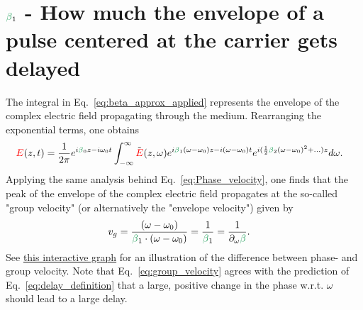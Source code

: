 \section{$\betag_1$ - How much the envelope of a pulse centered at the carrier gets delayed}
The integral in Eq.~\ref{eq:beta_approx_applied} represents the envelope of the complex electric field propagating through the medium. Rearranging the exponential terms, one obtains
\begin{align}
\label{eq:envelope_beta1}
    \E(z,t) &= \frac{1}{2\pi} e^{i\betag_0z-i\omega_0t}  \int_{-\infty}^{\infty} \Tilde{\E}(z,\omega) e^{i\betag_1(\omega-\omega_0)z-i(\omega-\omega_0) t} e^{i(\frac{1}{2}\betag_2(\omega-\omega_0)^2+...)z} d\omega.
\end{align}
Applying the same analysis behind Eq.~\ref{eq:Phase_velocity}, one finds that the peak of the envelope of the complex electric field propagates at the so-called "group velocity" (or alternatively the "envelope velocity") given by
\begin{align}
\label{eq:group_velocity}
    v_g &= \frac{(\omega-\omega_0)}{\betag_1\cdot(\omega-\omega_0)} = \frac{1}{\betag_1} = \frac{1}{\partial_\omega\betag}.
\end{align}
See \href{https://www.desmos.com/calculator/rq2physwac}{this interactive graph} for an illustration of the difference between phase- and group velocity. Note that Eq.~\ref{eq:group_velocity} agrees with the prediction of Eq.~\ref{eq:delay_definition} that a large, positive change in the phase w.r.t. $\omega$ should lead to a large delay.




